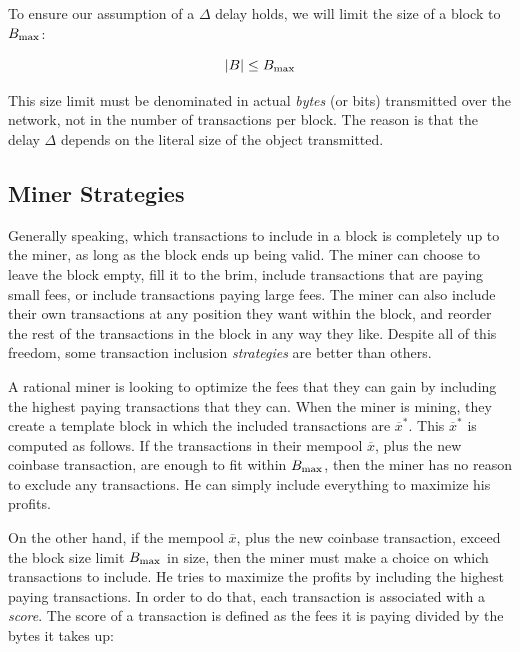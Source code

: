 To ensure our assumption of a $\Delta$ delay holds, we will limit the size of a block
to $B_\mathrm{max}$:

\[
    |B| \leq B_\mathrm{max}
\]

This size limit must be denominated in actual \emph{bytes} (or bits) transmitted
over the network, not in the number of transactions per block. The reason is that the delay
$\Delta$ depends on the literal size of the object transmitted.


\subsection*{Miner Strategies}

Generally speaking, which transactions to include in a block is completely up to the miner,
as long as the block ends up being valid. The miner can choose to leave the block empty,
fill it to the brim, include transactions that are paying small fees, or include transactions
paying large fees. The miner can also include their own transactions at any position they
want within the block, and reorder the rest of the transactions in the block in any way
they like. Despite all of this freedom, some transaction inclusion \emph{strategies} are better than
others.

A rational miner is looking to optimize the fees that they can gain by including the highest
paying transactions that they can. When the miner is mining, they create a template block
in which the included transactions are $\overline{x}^*$. This $\overline{x}^*$ is computed
as follows. If the transactions in their mempool $\overline{x}$, plus
the new coinbase transaction, are enough to fit within $B_\mathrm{max}$, then the miner has no reason
to exclude any transactions. He can simply include everything to maximize his profits.

On the other hand, if the mempool $\overline{x}$, plus the new coinbase transaction, exceed
the block size limit $B_\mathrm{max}$ in size, then the miner must make a choice on which transactions
to include. He tries to maximize the profits by including the highest paying transactions.
In order to do that, each transaction is associated with a \emph{score}.
The score of a transaction is defined as the fees it is paying divided by the bytes it takes up:

